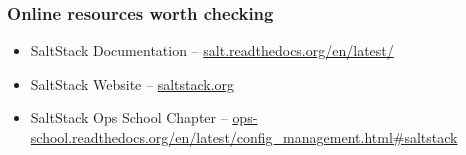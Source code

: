 \documentclass[compress]{beamer}
\begin{document}
\begin{frame}
\frametitle{Online resources worth checking}

\begin{itemize}
  \item SaltStack Documentation -- \href{http://salt.readthedocs.org/en/latest/}{salt.readthedocs.org/en/latest/}
  \item SaltStack Website -- \href{http://saltstack.com/about.html}{saltstack.org}
  \item SaltStack Ops School Chapter -- \href{http://ops-school.readthedocs.org/en/latest/config\_management.html\#saltstack}{ops-school.readthedocs.org/en/latest/config\_management.html\#saltstack}
\end{itemize}

\end{frame}
\end{document}
